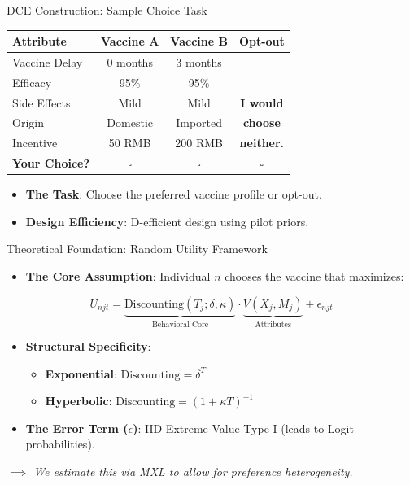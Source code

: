\documentclass[10pt]{beamer}
\begin{document}
\begin{frame}{DCE Construction: Sample Choice Task}
\begin{table}
\centering
\small
\begin{tabular}{|l|c|c|c|}
\hline
\textbf{Attribute} & \textbf{Vaccine A} & \textbf{Vaccine B} & \textbf{Opt-out} \\
\hline
Vaccine Delay & 0 months & 3 months & \\
Efficacy & 95\% & 95\% & \\
Side Effects & Mild & Mild & \textbf{I would} \\
Origin & Domestic & Imported & \textbf{choose} \\
Incentive & 50 RMB & 200 RMB & \textbf{neither.} \\
\hline
\textbf{Your Choice?} & $\square$ & $\square$ & $\square$ \\
\hline
\end{tabular}
\end{table}
\begin{itemize}
\item \textbf{The Task}: Choose the preferred vaccine profile or opt-out.
\item \textbf{Design Efficiency}: D-efficient design using pilot priors.
\end{itemize}
\end{frame}



\begin{frame}{Theoretical Foundation: Random Utility Framework}
    \begin{itemize}
        \item \textbf{The Core Assumption}: Individual $n$ chooses the vaccine that maximizes:
    \end{itemize}
    
    \begin{equation}
        U_{njt} = \underbrace{\text{Discounting}(T_j; \delta, \kappa)}_{\text{Behavioral Core}} \cdot \underbrace{V(X_j, M_j)}_{\text{Attributes}} + \epsilon_{njt}
    \end{equation}
    
    \vspace{0.4cm}
    \begin{itemize}
        \item \textbf{Structural Specificity}:
        \begin{itemize}
            \item \textbf{Exponential}: $\text{Discounting} = \delta^T$
            \item \textbf{Hyperbolic}: $\text{Discounting} = (1 + \kappa T)^{-1}$
        \end{itemize}
        \item \textbf{The Error Term ($\epsilon$)}: IID Extreme Value Type I (leads to Logit probabilities).
    \end{itemize}
    \vfill
    \centering \textit{$\implies$ We estimate this via MXL to allow for preference heterogeneity.}
\end{frame}
\end{document}
